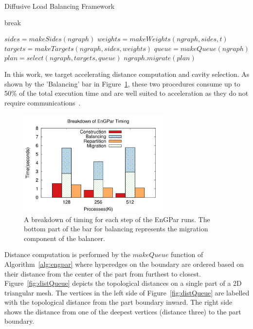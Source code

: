 \documentclass[graybox]{svmult}
\begin{document}
\begin{algorithm}[H]
  \caption{Diffusive Load Balancing Framework}
  \label{alg:engpar}
  \small
  \begin{algorithmic}[1]
    \State break
    \EndIf
    \EndWhile
    \EndFor
    \EndProcedure

    \State $sides = makeSides(ngraph)$
    \State $weights = makeWeights(ngraph,sides,t)$
    \State $targets = makeTargets(ngraph,sides,weights)$
    \State $queue = makeQueue(ngraph)$
    \State $plan = select(ngraph,targets,queue)$
    \State $ngraph.migrate(plan)$
    \EndProcedure
  \end{algorithmic}
\end{algorithm}

In this work, we target accelerating distance computation and cavity selection.
As shown by the 'Balancing' bar in Figure~\ref{fig:partsgraph}, these two
procedures consume up to 50\% of the total execution time and are well suited to
acceleration as they do not require communications~\cite{engparSC17}.

\begin{figure}
  \centering
  \includegraphics[width=3in]{images/timeparts_v_cores.png}
  \caption{A breakdown of timing for each step of the EnGPar runs. The
    bottom part of the bar for balancing represents the migration
    component of the balancer.~\cite{engparSC17}}
  \label{fig:partsgraph}
\end{figure}

Distance computation is performed by the $makeQueue$ function of
Algorithm~\ref{alg:engpar} where hyperedges on the boundary are ordered based on
their distance from the center of the part from furthest to closest.
Figure~\ref{fig:distQueue} depicts the topological distances on a single part of
a 2D triangular mesh.
The vertices in the left side of Figure~\ref{fig:distQueue} are labelled with
the topological distance from the part boundary inward.
The right side shows the distance from one of the deepest vertices (distance
three) to the part boundary.
\end{document}
